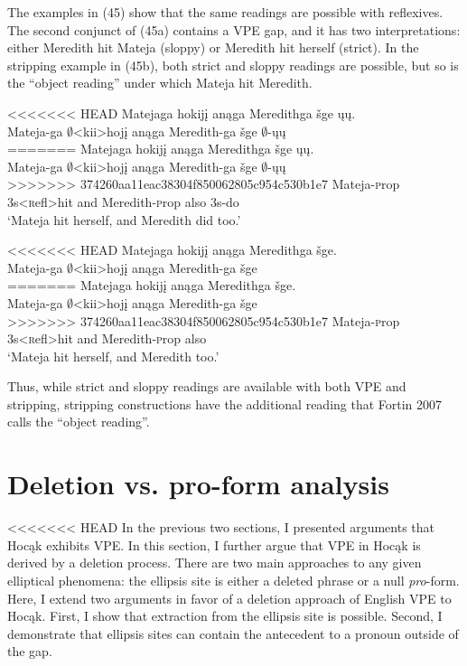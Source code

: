 \documentclass[output=paper]{LSP/langsci}
\begin{document}
The examples in (45) show that the same readings are possible with reflexives. The second conjunct of (45a) contains a VPE gap, and it has two interpretations: either Meredith hit Mateja (sloppy) or Meredith hit herself (strict). In the stripping example in (45b), both strict and sloppy readings are possible, but so is the ``object reading'' under which Mateja hit Meredith.

\begin{exe}
\ex
\begin{xlist}
\ex
<<<<<<< HEAD
\glll Matejaga hokijį anąga Meredithga šge ųų.\\
Mateja-ga $\emptyset$<kii>hojį anąga Meredith-ga šge $\emptyset$-ųų\\
=======
\glll Matejaga hokij\k{i} an\k{a}ga Meredithga \v{s}ge \k{u}\k{u}.\\
Mateja-ga $\emptyset$<kii>hoj\k{i} an\k{a}ga Meredith-ga \v{s}ge $\emptyset$-\k{u}\k{u}\\
>>>>>>> 374260aa11eac38304f850062805c954c530b1e7
Mateja-{\textsc prop} {\textsc 3s}<{\textsc refl}>hit and Meredith-{\textsc prop} also {\textsc 3s}-do\\
\trans `Mateja hit herself, and Meredith did too.'

\ex
<<<<<<< HEAD
\glll Matejaga hokijį anąga Meredithga šge.\\
Mateja-ga $\emptyset$<kii>hojį anąga Meredith-ga šge\\ 
=======
\glll Matejaga hokij\k{i} an\k{a}ga Meredithga \v{s}ge.\\
Mateja-ga $\emptyset$<kii>hoj\k{i} an\k{a}ga Meredith-ga \v{s}ge\\ 
>>>>>>> 374260aa11eac38304f850062805c954c530b1e7
Mateja-{\textsc prop} {\textsc 3s}<{\textsc refl}>hit and Meredith-{\textsc prop} also\\ 
\trans `Mateja hit herself, and Meredith too.'
\end{xlist}
\end{exe}

Thus, while strict and sloppy readings are available with both VPE and stripping, stripping constructions have the additional reading that Fortin 2007 calls the ``object reading''.


\section{Deletion vs. pro-form analysis}

<<<<<<< HEAD
In the previous two sections, I presented arguments that Hocąk exhibits VPE. In this section, I further argue that VPE in Hocąk is derived by a deletion process. There are two main approaches to any given elliptical phenomena: the ellipsis site is either a deleted phrase or a null \emph{pro}-form. Here, I extend two arguments in favor of a deletion approach of English VPE to Hocąk. First, I show that extraction from the ellipsis site is possible. Second, I demonstrate that ellipsis sites can contain the antecedent to a pronoun outside of the gap.
\end{document}
